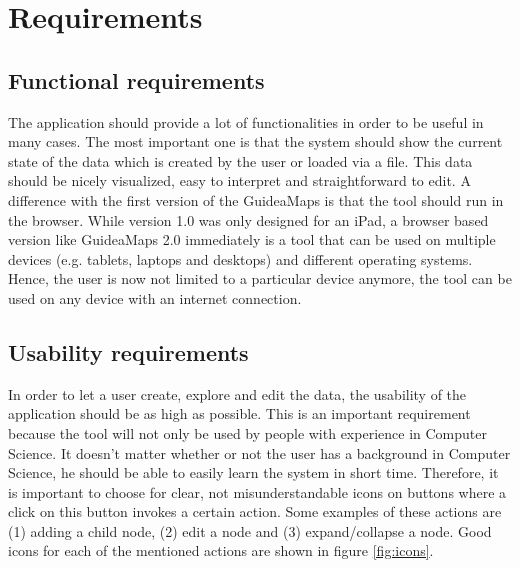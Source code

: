\chapter{Requirements}\label{ch:requirements}

\section{Functional requirements}\label{sec:functional-requirements}
The application should provide a lot of functionalities in order to be useful in many cases. The most important one is that the system should show the current state of the data which is created by the user or loaded via a file. This data should be nicely visualized, easy to interpret and straightforward to edit. A difference with the first version of the GuideaMaps is that the tool should run in the browser. While version 1.0 was only designed for an iPad, a browser based version like GuideaMaps 2.0 immediately is a tool that can be used on multiple devices (e.g. tablets, laptops and desktops) and different operating systems. Hence, the user is now not limited to a particular device anymore, the tool can be used on any device with an internet connection.

\section{Usability requirements}\label{sec:usability-requirements}
In order to let a user create, explore and edit the data, the usability of the application should be as high as possible. This is an important requirement because the tool will not only be used by people with experience in Computer Science. It doesn't matter whether or not the user has a background in Computer Science, he should be able to easily learn the system in short time. Therefore, it is important to choose for clear, not misunderstandable icons on buttons where a click on this button invokes a certain action. Some examples of these actions are (1) adding a child node, (2) edit a node and (3) expand/collapse a node. Good icons for each of the mentioned actions are shown in figure \ref{fig:icons}.

